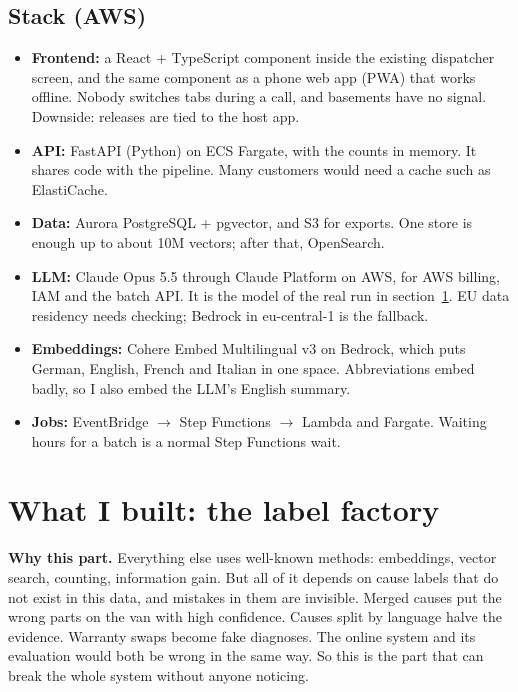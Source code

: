 \documentclass[11pt,a4paper]{article}
\newcommand{\ra}{\ensuremath{\rightarrow}}
\begin{document}
\subsection{Stack (AWS)}\label{sec:stack}

\begin{itemize}[itemsep=0.35em]
  \item \textbf{Frontend:} a React + TypeScript component inside the existing dispatcher screen, and the same component as a phone web app (PWA) that works offline. Nobody switches tabs during a call, and basements have no signal. Downside: releases are tied to the host app.
  \item \textbf{API:} FastAPI (Python) on ECS Fargate, with the counts in memory. It shares code with the pipeline. Many customers would need a cache such as ElastiCache.
  \item \textbf{Data:} Aurora PostgreSQL + pgvector, and S3 for exports. One store is enough up to about 10M vectors; after that, OpenSearch.
  \item \textbf{LLM:} Claude Opus 5.5 through Claude Platform on AWS, for AWS billing, IAM and the batch API. It is the model of the real run in section~\ref{sec:built}. EU data residency needs checking; Bedrock in eu-central-1 is the fallback.
  \item \textbf{Embeddings:} Cohere Embed Multilingual v3 on Bedrock, which puts German, English, French and Italian in one space. Abbreviations embed badly, so I also embed the LLM's English summary.
  \item \textbf{Jobs:} EventBridge \ra{} Step Functions \ra{} Lambda and Fargate. Waiting hours for a batch is a normal Step Functions wait.
\end{itemize}

\section{What I built: the label factory}\label{sec:built}

\textbf{Why this part.} Everything else uses well-known methods: embeddings, vector search, counting, information gain. But all of it depends on cause labels that do not exist in this data, and mistakes in them are invisible. Merged causes put the wrong parts on the van with high confidence. Causes split by language halve the evidence. Warranty swaps become fake diagnoses. The online system and its evaluation would both be wrong in the same way. So this is the part that can break the whole system without anyone noticing.
\end{document}
